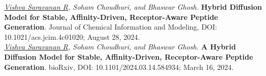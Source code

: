\noindent
\textit{\underline{Vishva Saravanan R}, Soham Choudhuri, and Bhaswar Ghosh.} \textbf{Hybrid Diffusion Model for Stable, Affinity-Driven, Receptor-Aware Peptide Generation}. Journal of Chemical Information and Modeling, DOI: 10.1021/acs.jcim.4c01020; August 28, 2024. \\

\noindent
\textit{\underline{Vishva Saravanan R}, Soham Choudhuri, and Bhaswar Ghosh.} \textbf{A Hybrid Diffusion Model for Stable, Affinity-Driven, Receptor-Aware Peptide Generation}. bioRxiv, DOI: 10.1101/2024.03.14.584934; March 16, 2024.

